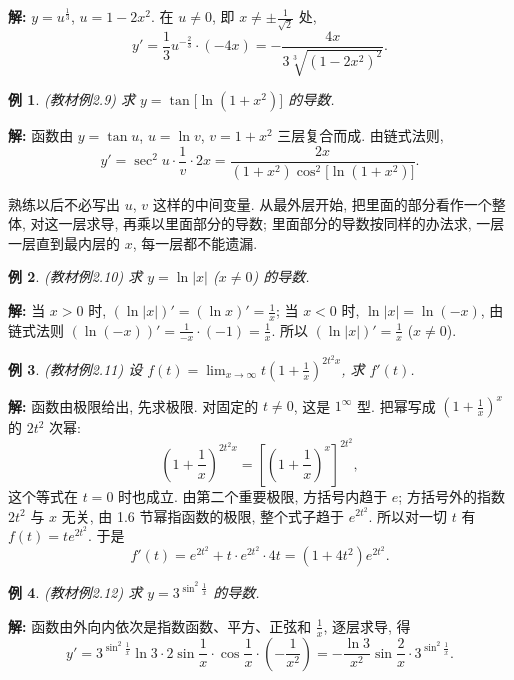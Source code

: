 \documentclass[UTF8,openany]{ctexbook}
\theoremstyle{chinesetextbook}
\newtheorem{example}{例}[section]
\newenvironment{cnsolution}{\par\indent\textbf{解:} \ignorespaces}{\par}
\begin{document}
\begin{cnsolution}
$y=u^{\frac13}$, $u=1-2x^2$. 在 $u\ne0$, 即 $\displaystyle x\ne\pm\frac1{\sqrt2}$ 处,
\[
y'=\frac13u^{-\frac23}\cdot(-4x)=-\frac{4x}{3\sqrt[3]{(1-2x^2)^2}}.
\]
\end{cnsolution}
\begin{example}\label{ex:c2-2-9}
\textnormal{(教材例2.9)} 求 $y=\tan\bigl[\ln(1+x^2)\bigr]$ 的导数.
\end{example}
\begin{cnsolution}
函数由 $y=\tan u$, $u=\ln v$, $v=1+x^2$ 三层复合而成. 由链式法则,
\[
y'=\sec^2u\cdot\frac1v\cdot2x=\frac{2x}{(1+x^2)\cos^2\bigl[\ln(1+x^2)\bigr]}.
\]
\end{cnsolution}
熟练以后不必写出 $u$, $v$ 这样的中间变量. 从最外层开始, 把里面的部分看作一个整体, 对这一层求导, 再乘以里面部分的导数; 里面部分的导数按同样的办法求, 一层一层直到最内层的 $x$, 每一层都不能遗漏.
\begin{example}\label{ex:c2-2-10}
\textnormal{(教材例2.10)} 求 $y=\ln|x|$ ($x\ne0$) 的导数.
\end{example}
\begin{cnsolution}
当 $x>0$ 时, $\displaystyle(\ln|x|)'=(\ln x)'=\frac1x$; 当 $x<0$ 时, $\ln|x|=\ln(-x)$, 由链式法则 $\displaystyle(\ln(-x))'=\frac1{-x}\cdot(-1)=\frac1x$. 所以 $\displaystyle(\ln|x|)'=\frac1x$ ($x\ne0$).
\end{cnsolution}
\begin{example}\label{ex:c2-2-11}
\textnormal{(教材例2.11)} 设 $\displaystyle f(t)=\lim_{x\to\infty}t\left(1+\frac1x\right)^{2t^2x}$, 求 $f'(t)$.
\end{example}
\begin{cnsolution}
函数由极限给出, 先求极限. 对固定的 $t\ne0$, 这是 $1^\infty$ 型. 把幂写成 $\displaystyle\left(1+\frac1x\right)^x$ 的 $2t^2$ 次幂:
\[
\left(1+\frac1x\right)^{2t^2x}=\left[\left(1+\frac1x\right)^x\right]^{2t^2},
\]
这个等式在 $t=0$ 时也成立. 由第二个重要极限, 方括号内趋于 $e$; 方括号外的指数 $2t^2$ 与 $x$ 无关, 由 1.6 节幂指函数的极限, 整个式子趋于 $e^{2t^2}$. 所以对一切 $t$ 有 $f(t)=te^{2t^2}$. 于是
\[
f'(t)=e^{2t^2}+t\cdot e^{2t^2}\cdot4t=(1+4t^2)e^{2t^2}.
\]
\end{cnsolution}
\begin{example}\label{ex:c2-2-12}
\textnormal{(教材例2.12)} 求 $y=3^{\sin^2\frac1x}$ 的导数.
\end{example}
\begin{cnsolution}
函数由外向内依次是指数函数、平方、正弦和 $\displaystyle\frac1x$, 逐层求导, 得
\[
y'=3^{\sin^2\frac1x}\ln3\cdot2\sin\frac1x\cdot\cos\frac1x\cdot\left(-\frac1{x^2}\right)=-\frac{\ln3}{x^2}\sin\frac2x\cdot3^{\sin^2\frac1x}.
\]
\end{cnsolution}
\end{document}
